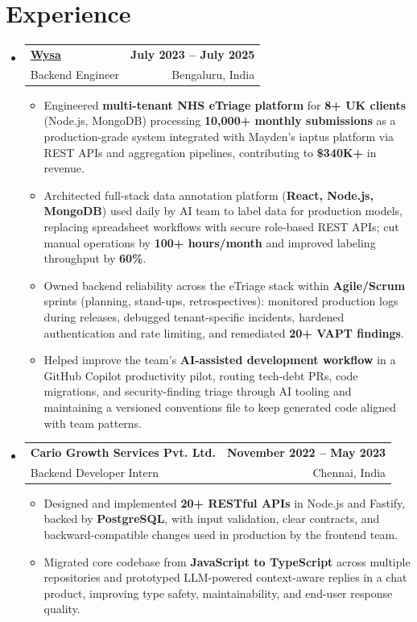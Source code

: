 \documentclass[letterpaper,10pt]{article}
\makeatletter
\newcommand{\resumeItem}[1]{
  \item\small{#1\vspace{-1pt}}
}
\newcommand{\resumeSubheading}[4]{
  \vspace{1pt}\item
    \begin{tabular*}{0.985\textwidth}[t]{l@{\extracolsep{\fill}}r}
      \textbf{#1} & \textbf{\small #2} \\
      {\small\color{ResumeSlate} #3} & {\small\color{ResumeSlate} #4} \\
    \end{tabular*}\vspace{-6pt}
}
\newcommand{\resumeSubHeadingListStart}{\begin{itemize}[leftmargin=0.0in, label={}, itemsep=2pt, topsep=2pt]}
\newcommand{\resumeSubHeadingListEnd}{\end{itemize}}
\newcommand{\resumeItemListStart}{\begin{itemize}[leftmargin=0.18in, itemsep=2pt, topsep=1pt]}
\newcommand{\resumeItemListEnd}{\end{itemize}\vspace{-4pt}}
\makeatother
\begin{document}
\section{Experience}
\resumeSubHeadingListStart
  \resumeSubheading
    {\href{https://www.wysa.io}{Wysa}}{July 2023 -- July 2025}
    {Backend Engineer}{Bengaluru, India}
    \resumeItemListStart
      \resumeItem{Engineered \textbf{multi-tenant NHS eTriage platform} for \textbf{8+ UK clients} (Node.js, MongoDB) processing \textbf{10{,}000+ monthly submissions} as a production-grade system integrated with Mayden's iaptus platform via REST APIs and aggregation pipelines, contributing to \textbf{\$340K+} in revenue.}
      \resumeItem{Architected full-stack data annotation platform (\textbf{React, Node.js, MongoDB}) used daily by AI team to label data for production models, replacing spreadsheet workflows with secure role-based REST APIs; cut manual operations by \textbf{100+ hours/month} and improved labeling throughput by \textbf{60\%}.}
      \resumeItem{Owned backend reliability across the eTriage stack within \textbf{Agile/Scrum} sprints (planning, stand-ups, retrospectives): monitored production logs during releases, debugged tenant-specific incidents, hardened authentication and rate limiting, and remediated \textbf{20+ VAPT findings}.}
      \resumeItem{Helped improve the team's \textbf{AI-assisted development workflow} in a GitHub Copilot productivity pilot, routing tech-debt PRs, code migrations, and security-finding triage through AI tooling and maintaining a versioned conventions file to keep generated code aligned with team patterns.}
    \resumeItemListEnd
  \resumeSubheading
    {Cario Growth Services Pvt. Ltd.}{November 2022 -- May 2023}
    {Backend Developer Intern}{Chennai, India}
    \resumeItemListStart
      \resumeItem{Designed and implemented \textbf{20+ RESTful APIs} in Node.js and Fastify, backed by \textbf{PostgreSQL}, with input validation, clear contracts, and backward-compatible changes used in production by the frontend team.}
      \resumeItem{Migrated core codebase from \textbf{JavaScript to TypeScript} across multiple repositories and prototyped LLM-powered context-aware replies in a chat product, improving type safety, maintainability, and end-user response quality.}
    \resumeItemListEnd
\resumeSubHeadingListEnd
\vspace{-4pt}
\end{document}
